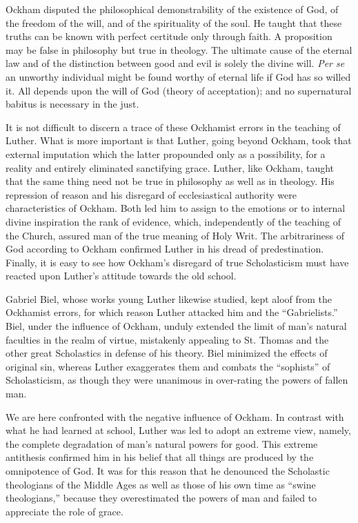Ockham disputed the philosophical demonstrability of the existence of
God, of the freedom of the will, and of the spirituality of the soul. He
taught that these truths can be known with perfect certitude only through
faith. A proposition may be false in philosophy but true in theology. The
ultimate cause of the eternal law and of the distinction between good and
evil is solely the divine will. \textit{Per se} an unworthy individual might be found
worthy of eternal life if God has so willed it. All depends upon the will
of God (theory of acceptation); and no supernatural babitus is necessary in
the just.

It is not difficult to discern a trace of these Ockhamist errors in the
teaching of Luther. What is more important is that Luther, going beyond
Ockham, took that external imputation which the latter propounded only
as a possibility, for a reality and entirely eliminated sanctifying grace.
Luther, like Ockham, taught that the same thing need not be true in
philosophy as well as in theology. His repression of reason and his disregard
of ecclesiastical authority were characteristics of Ockham. Both led him
to assign to the emotions or to internal divine inspiration the rank of
evidence, which, independently of the teaching of the Church, assured man of
the true meaning of Holy Writ. The arbitrariness of God according to Ockham
confirmed Luther in his dread of predestination. Finally, it is easy to see
how Ockham’s disregard of true Scholasticism must have reacted upon
Luther’s attitude towards the old school.

Gabriel Biel, whose works young Luther likewise studied, kept aloof
from the Ockhamist errors, for which reason Luther attacked him and the
“Gabrielists.” Biel, under the influence of Ockham, unduly extended the
limit of man’s natural faculties in the realm of virtue, mistakenly appealing
to St. Thomas and the other great Scholastics in defense of his theory. Biel
minimized the effects of original sin, whereas Luther exaggerates them and
combats the “sophists” of Scholasticism, as though they were unanimous
in over-rating the powers of fallen man.

We are here confronted with the negative influence of Ockham. In contrast
with what he had learned at school, Luther was led to adopt an extreme
view, namely, the complete degradation of man’s natural powers
for good. This extreme antithesis confirmed him in his belief that all
things are produced by the omnipotence of God. It was for this reason
that he denounced the Scholastic theologians of the Middle Ages as well
as those of his own time as “swine theologians,” because they overestimated
the powers of man and failed to appreciate the role of grace.

